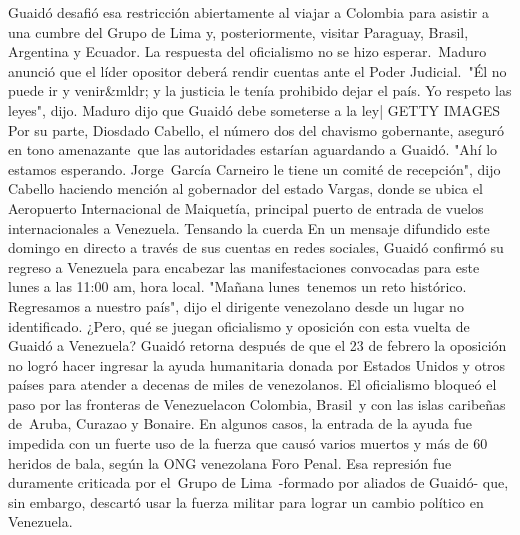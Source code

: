 \documentclass{article}%
\begin{document}
\newline%
%
Guaidó desafió esa restricción abiertamente al viajar a Colombia para asistir a una cumbre del Grupo de Lima y, posteriormente, visitar Paraguay, Brasil, Argentina y Ecuador.%
\newline%
%
La respuesta del oficialismo no se hizo esperar.~Maduro anunció que el líder opositor deberá rendir cuentas ante el Poder Judicial.~"Él no puede ir y venir\&mldr; y la justicia le tenía prohibido dejar el país. Yo respeto las leyes", dijo.%
\newline%
%
Maduro dijo que Guaidó debe someterse a la ley| GETTY IMAGES%
\newline%
%
Por su parte, Diosdado Cabello, el número dos del chavismo gobernante, aseguró en tono amenazante~que las autoridades estarían aguardando a Guaidó.%
\newline%
%
"Ahí lo estamos esperando. Jorge~García Carneiro le tiene un comité de recepción", dijo Cabello haciendo mención al gobernador del estado Vargas, donde se ubica el Aeropuerto Internacional de Maiquetía, principal puerto de entrada de vuelos internacionales a Venezuela.%
\newline%
%
Tensando la cuerda%
\newline%
%
En un mensaje difundido este domingo en directo a través de sus cuentas en redes sociales, Guaidó confirmó su regreso a Venezuela para encabezar las manifestaciones convocadas para este lunes a las 11:00 am, hora local.%
\newline%
%
"Mañana lunes~tenemos un reto histórico. Regresamos a nuestro país", dijo el dirigente venezolano desde un lugar no identificado.%
\newline%
%
¿Pero, qué se juegan oficialismo y oposición con esta vuelta de Guaidó a Venezuela?%
\newline%
%
Guaidó retorna después de que el 23 de febrero la oposición no logró hacer ingresar la ayuda humanitaria donada por Estados Unidos y otros países para atender a decenas de miles de venezolanos.%
\newline%
%
El oficialismo bloqueó el paso por las fronteras de Venezuelacon Colombia, Brasil~y con las islas caribeñas de~Aruba, Curazao y Bonaire.%
\newline%
%
En algunos casos, la entrada de la ayuda fue impedida con un fuerte uso de la fuerza que causó varios muertos y más de 60 heridos de bala, según la ONG venezolana Foro Penal.%
\newline%
%
Esa represión fue duramente criticada por el~Grupo de Lima~{-}formado por aliados de Guaidó{-} que, sin embargo, descartó usar la fuerza militar para lograr un cambio político en Venezuela.%
\end{document}
